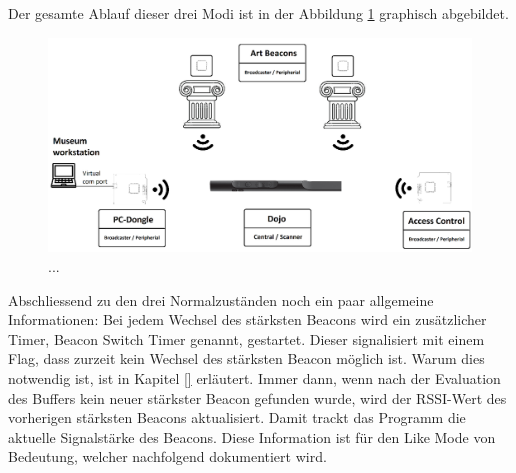 Der gesamte Ablauf dieser drei Modi ist in der Abbildung \ref{fig:soft_3} graphisch abgebildet.
\begin{figure}[h]
	\centering
	\includegraphics[width=\textwidth]{graphics/platzhalter.png}
	\caption{ ... }
	\label{fig:soft_3}
\end{figure}

 
 
 
Abschliessend zu den drei Normalzuständen noch ein paar allgemeine Informationen: Bei jedem Wechsel des stärksten Beacons wird ein zusätzlicher Timer, Beacon Switch Timer genannt, gestartet. Dieser signalisiert mit einem Flag, dass zurzeit kein Wechsel des stärksten Beacon möglich ist. Warum dies notwendig ist, ist in Kapitel \ref{} erläutert. Immer dann, wenn nach der Evaluation des Buffers kein neuer stärkster Beacon gefunden wurde, wird der RSSI-Wert des vorherigen stärksten Beacons aktualisiert. Damit trackt das Programm die aktuelle Signalstärke des Beacons. Diese Information ist für den Like Mode von Bedeutung, welcher nachfolgend dokumentiert wird.
